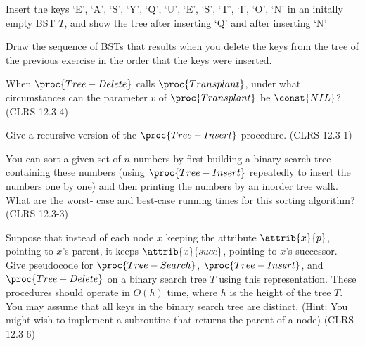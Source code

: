 \documentclass{article}
\begin{document}
\thispagestyle{fancy}

\begin{Exercise}[title={Simple training exercises}]

    \Question
    Insert the keys `E', `A', `S', `Y', `Q', `U', `E', `S', `T', `I', `O', `N'
    in an initally empty BST $T$, and show the tree after inserting `Q' and
    after inserting `N'

    \Question
    Draw the sequence of BSTs that results when you delete the keys from the
    tree of the previous exercise in the order that the keys were inserted.

    \Question
    When $\proc{Tree-Delete}$ calls $\proc{Transplant}$, under what
    circumstances can the parameter $v$ of $\proc{Transplant}$ be $\const{NIL}$?
    (CLRS 12.3-4)
\end{Exercise}

\begin{Exercise}[title={Fun creative exercises!}]
    \Question
    Give a recursive version of the $\proc{Tree-Insert}$ procedure. (CLRS
    12.3-1)

    \Question
    You can sort a given set of $n$ numbers by first building a binary search
    tree containing these numbers (using $\proc{Tree-Insert}$ repeatedly to
    insert the numbers one by one) and then printing the numbers by an inorder
    tree walk. What are the worst- case and best-case running times for this
    sorting algorithm? (CLRS 12.3-3)

    \Question
    Suppose that instead of each node $x$ keeping the attribute $\attrib{x}{p}$,
    pointing to $x$’s parent, it keeps $\attrib{x}{succ}$, pointing to $x$’s
    successor. Give pseudocode for $\proc{Tree-Search}$, $\proc{Tree-Insert}$,
    and $\proc{Tree-Delete}$ on a binary search tree $T$ using this
    representation. These procedures should operate in $O(h)$ time, where $h$ is
    the height of the tree $T$. You may assume that all keys in the binary
    search tree are distinct. (Hint: You might wish to implement a subroutine
    that returns the parent of a node) (CLRS 12.3-6)
\end{Exercise}
\end{document}

